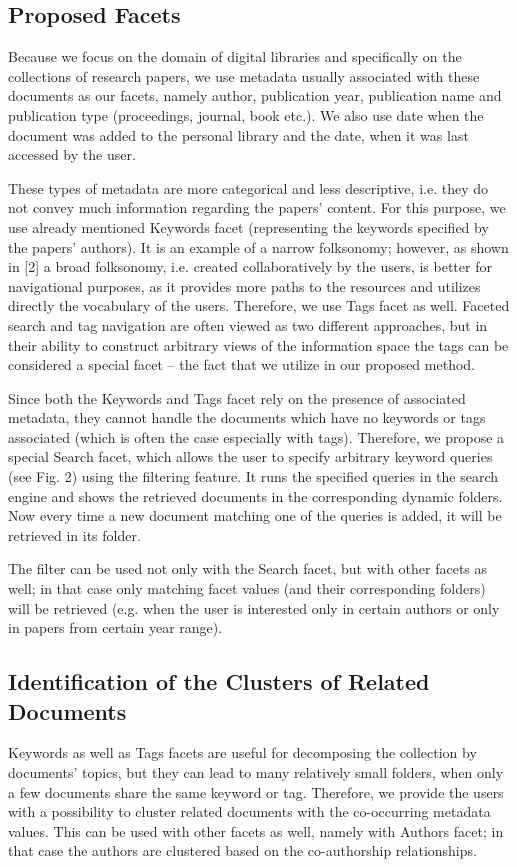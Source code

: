 \documentclass{article}
\begin{document}
\subsection{Proposed Facets}

Because we focus on the domain of digital libraries and specifically on the collections of research papers, we use metadata usually associated with these documents as our facets, namely author, publication year, publication name and publication type (proceedings, journal, book etc.). We also use date when the document was added to the personal library and the date, when it was last accessed by the user.

 These types of metadata are more categorical and less descriptive, i.e. they do not convey much information regarding the papers’ content. For this purpose, we use already mentioned Keywords facet (representing the keywords specified by the papers’ authors). It is an example of a narrow folksonomy; however, as shown in [2] a broad folksonomy, i.e. created collaboratively by the users, is better for navigational purposes, as it provides more paths to the resources and utilizes directly the vocabulary of the users. Therefore, we use Tags facet as well. Faceted search and tag navigation are often viewed as two different approaches, but in their ability to construct arbitrary views of the information space the tags can be considered a special facet – the fact that we utilize in our proposed method.
 
  Since both the Keywords and Tags facet rely on the presence of associated metadata, they cannot handle the documents which have no keywords or tags associated (which is often the case especially with tags). Therefore, we propose a special Search facet, which allows the user to specify arbitrary keyword queries (see Fig. 2) using the filtering feature. It runs the specified queries in the search engine and shows the retrieved documents in the corresponding dynamic folders. Now every time a new document matching one of the queries is added, it will be retrieved in its folder.
  
   The filter can be used not only with the Search facet, but with other facets as well; in that case only matching facet values (and their corresponding folders) will be retrieved (e.g. when the user is interested only in certain authors or only in papers from certain year range). 
   \subsection{Identification of the Clusters of Related Documents }
   Keywords as well as Tags facets are useful for decomposing the collection by documents’ topics, but they can lead to many relatively small folders, when only a few documents share the same keyword or tag. Therefore, we provide the users with a possibility to cluster related documents with the co-occurring metadata values. This can be used with other facets as well, namely with Authors facet; in that case the authors are clustered based on the co-authorship relationships. 
   
\end{document}
